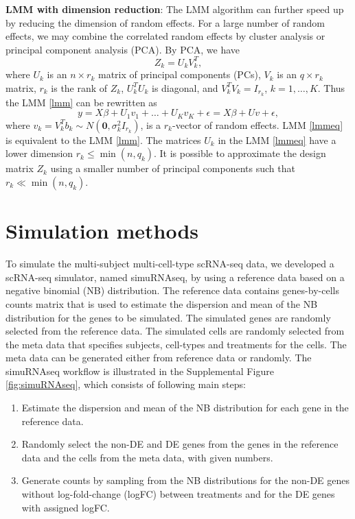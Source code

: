 \documentclass[
]{article}
\providecommand{\tightlist}{%
  \setlength{\itemsep}{0pt}\setlength{\parskip}{0pt}}
\begin{document}
\textbf{LMM with dimension reduction}: The LMM algorithm can further
speed up by reducing the dimension of random effects. For a large number
of random effects, we may combine the correlated random effects by
cluster analysis or principal component analysis (PCA). By PCA, we have
\[Z_k = U_kV_k^T,\] where \(U_k\) is an \(n\times r_k\) matrix of
principal components (PCs), \(V_k\) is an \(q\times r_k\) matrix,
\(r_k\) is the rank of \(Z_k\), \(U_k^TU_k\) is diagonal, and
\(V_k^TV_k=I_{r_k}\), \(k=1, \ldots, K\). Thus the LMM \eqref{lmm} can
be rewritten as \begin{equation}\label{lmmeq}
y = X\beta + U_1v_1 + \ldots + U_Kv_K + \epsilon = X\beta + Uv + \epsilon,
\end{equation} where
\(v_k = V_k^Tb_k\sim N(\mathbf{0}, \sigma^2_k I_{r_k})\), is a
\(r_k\)-vector of random effects. LMM \eqref{lmmeq} is equivalent to the
LMM \eqref{lmm}. The matrices \(U_k\) in the LMM \eqref{lmmeq} have a
lower dimension \(r_k \leq\min(n, q_k)\). It is possible to approximate
the design matrix \(Z_k\) using a smaller number of principal components
such that \(r_k \ll\min(n, q_k)\).

\hypertarget{simulation-methods}{%
\section{Simulation methods}\label{simulation-methods}}

To simulate the multi-subject multi-cell-type scRNA-seq data, we
developed a scRNA-seq simulator, named simuRNAseq, by using a reference
data based on a negative binomial (NB) distribution. The reference data
contains genes-by-cells counts matrix that is used to estimate the
dispersion and mean of the NB distribution for the genes to be
simulated. The simulated genes are randomly selected from the reference
data. The simulated cells are randomly selected from the meta data that
specifies subjects, cell-types and treatments for the cells. The meta
data can be generated either from reference data or randomly. The
simuRNAseq workflow is illustrated in the Supplemental Figure
\ref{fig:simuRNAseq}, which consists of following main steps:

\begin{enumerate}
\def\labelenumi{(\arabic{enumi})}
\tightlist
\item
  Estimate the dispersion and mean of the NB distribution for each gene
  in the reference data.
\item
  Randomly select the non-DE and DE genes from the genes in the
  reference data and the cells from the meta data, with given numbers.
\item
  Generate counts by sampling from the NB distributions for the non-DE
  genes without log-fold-change (logFC) between treatments and for the
  DE genes with assigned logFC.
\end{enumerate}
\end{document}
